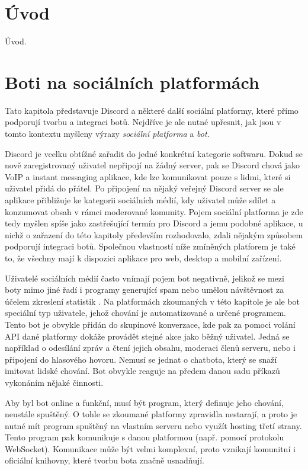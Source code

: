 \documentclass[FM]{tulthesis}
\begin{document}
	\chapter{Úvod}
	
	Úvod.
	
	\chapter{Boti na sociálních platformách}
	
	Tato kapitola představuje Discord a některé další sociální platformy, které přímo podporují tvorbu a integraci botů. Nejdříve je ale nutné upřesnit, jak jsou v tomto kontextu myšleny výrazy \textit{sociální platforma} a \textit{bot}.
	
	Discord je vcelku obtížné zařadit do jedné konkrétní kategorie softwaru. Dokud se nově zaregistrovaný uživatel nepřipojí na žádný server, pak se Discord chová jako VoIP a instant messaging aplikace, kde lze komunikovat pouze s lidmi, které si uživatel přidá do přátel. Po připojení na nějaký veřejný Discord server se ale aplikace přibližuje ke kategorii sociálních médií, kdy uživatel může sdílet a konzumovat obsah v rámci moderované komunity. Pojem sociální platforma je zde tedy myšlen spíše jako zastřešující termín pro Discord a jemu podobné aplikace, u nichž o zařazení do této kapitoly především rozhodovalo, zdali nějakým způsobem podporují integraci botů. Společnou vlastností níže zmíněných platforem je také to, že všechny mají k dispozici aplikace pro web, desktop a mobilní zařízení.
	
	Uživatelé sociálních médií často vnímají pojem bot negativně, jelikož se mezi boty mimo jiné řadí i programy generující spam nebo umělou návštěvnost za účelem zkreslení statistik \cite{lit_Discord}. Na platformách zkoumaných v této kapitole je ale bot speciální typ uživatele, jehož chování je automatizované a určené programem. Tento bot je obvykle přidán do skupinové konverzace, kde pak za pomoci volání API dané platformy dokáže provádět stejné akce jako běžný uživatel. Jedná se například o odesílání zpráv a čtení jejich obsahu, moderaci členů serveru, nebo i připojení do hlasového hovoru. Nemusí se jednat o chatbota, který se snaží imitovat lidské chování. Bot obvykle reaguje na předem danou sadu příkazů vykonáním nějaké činnosti.
		
	Aby byl bot online a funkční, musí být program, který definuje jeho chování, neustále spuštěný. O tohle se zkoumané platformy zpravidla nestarají, a proto je nutné mít program spuštěný na vlastním serveru nebo využít hosting třetí strany. Tento program pak komunikuje s danou platformou (např. pomocí protokolu \mbox{WebSocket}). Komunikace může být velmi komplexní, proto vznikají komunitní i oficiální knihovny, které tvorbu bota značně usnadňují.
	
\end{document}
